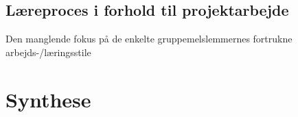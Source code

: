 \subsection{Læreproces i forhold til projektarbejde}
Den manglende fokus på de enkelte gruppemelslemmernes fortrukne arbejds-/læringsstile  
\section{Synthese}

